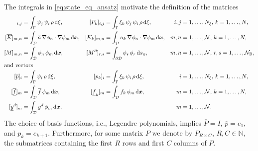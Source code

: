 \documentclass[a4paper,10pt]{article}
\newcommand{\cD}{{\mathcal{D}}}
\newcommand{\N}{{\mathcal{N}}}
\renewcommand{\d}{\textup{d}}
\numberwithin{theorem}{section}
\begin{document}
The integrals in \eqref{eq:state_eq_ansatz} motivate the definition of the matrices
\begin{align*}  
  [\overline P]_{i,j} &= \int_\Gamma\psi_j\,\psi_i\,\rho \, \d \xi,
  & [P_k]_{i,j} &= \int_\Gamma\xi_k\,\psi_j\,\psi_i\,\rho\,\d \xi,   &   i,j&=1,\ldots,N_{\xi},\, k=1,\ldots,N, \\
  [\overline K]_{m,n} &= \int_{\cD} \overline a\,\nabla\phi_n\cdot\nabla\phi_m\,\d \boldsymbol{x},
  &[K_k]_{m,n} &= \int_{\cD} a_k\,\nabla \phi_n\cdot \nabla \phi_m\,\d \boldsymbol{x}, &m,n&=1,\ldots,\N,\, k=1,\ldots,N, \\
  [M]_{m,n} &= \int_{\cD} \phi_n\, \phi_m\,\d \boldsymbol{x}, & [M^\partial]_{r,s} &= \int_{\partial\cD} \phi_s\,\phi_r\,\d s_{\boldsymbol{x}}, &m,n&=1,\ldots,\N, \, r,s=1, \ldots, \N_{\textup{B}},\\
\intertext{and vectors}
  [\overline p]_i &= \int_\Gamma\psi_i\,\rho\,\d \xi,
  & [p_k]_i &= \int_\Gamma\xi_k\,\psi_i\,\rho\,\d \xi, &   i&=1,\ldots,N_{\xi},\, k=1,\ldots,N, \\
  [\underline{\overline{f}}]_m &= \int_\cD \overline f\,\phi_m \,\d \boldsymbol{x},& 
  [\underline{f}_k]_m &= \int_\cD f_k\,\phi_m\,\d \boldsymbol{x},  &m&=1,\ldots,\N,\, k=1,\ldots,N,  \\
  [\underline{y}^d]_m &= \int_\cD y^d\, \phi_m\,\d \boldsymbol{x},&&  &m&=1,\ldots,\N. 
\end{align*}
The choice of basis functions, i.e., Legendre polynomials,  implies $\overline P = I$, $\overline p = e_1$, and $p_k = e_{k+1}$. Furthermore, for some matrix $P$ we denote by $P_{R \times C}$, $R,C\in \mathbb N$, the submatrices containing the first $R$ rows and first $C$ columns of $P$.
\end{document}
